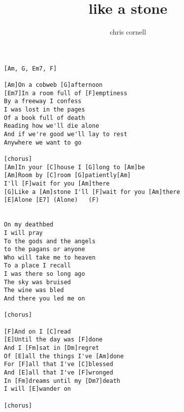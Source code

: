 \author{chris cornell}
\title{like a stone}
\maketitle
\begin{verbatim}
[Am, G, Em7, F]

[Am]On a cobweb [G]afternoon
[Em7]In a room full of [F]emptiness
By a freeway I confess
I was lost in the pages
Of a book full of death
Reading how we'll die alone
And if we're good we'll lay to rest
Anywhere we want to go

[chorus]
[Am]In your [C]house I [G]long to [Am]be
[Am]Room by [C]room [G]patiently[Am]
I'll [F]wait for you [Am]there
[G]Like a [Am]stone I'll [F]wait for you [Am]there
[E]Alone [E7] (Alone)   (F)


On my deathbed
I will pray
To the gods and the angels
to the pagans or anyone
Who will take me to heaven
To a place I recall
I was there so long ago
The sky was bruised
The wine was bled
And there you led me on

[chorus]

[F]And on I [C]read
[E]Until the day was [F]done
And I [Fm]sat in [Dm]regret
Of [E]all the things I've [Am]done
For [F]all that I've [C]blessed
And [E]all that I've [F]wronged
In [Fm]dreams until my [Dm7]death
I will [E]wander on

[chorus]
\end{verbatim}